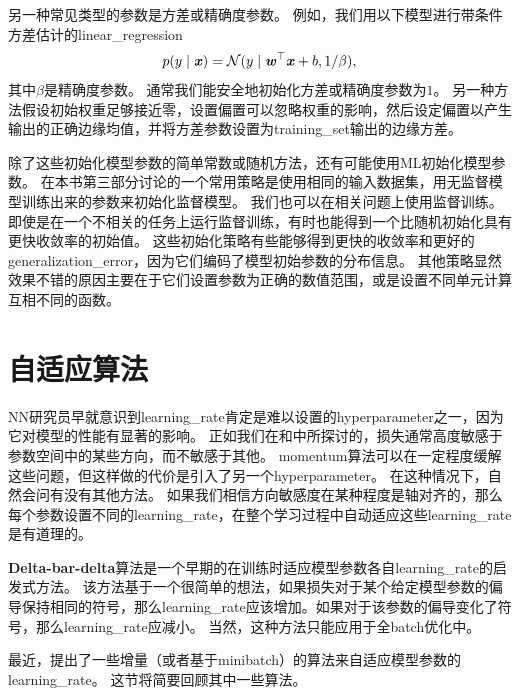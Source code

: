 另一种常见类型的参数是方差或精确度参数。
例如，我们用以下模型进行带条件方差估计的\gls{linear_regression}
\begin{equation}
    p(y\mid\boldsymbol{\mathit{x}}) = \mathcal{N} (y \mid \boldsymbol{\mathit{w}}^\top \boldsymbol{\mathit{x}} + b, 1/\beta) ,
\end{equation}
其中$\beta$是精确度参数。
通常我们能安全地初始化方差或精确度参数为$1$。
另一种方法假设初始权重足够接近零，设置偏置可以忽略权重的影响，然后设定偏置以产生输出的正确边缘均值，并将方差参数设置为\gls{training_set}输出的边缘方差。


除了这些初始化模型参数的简单常数或随机方法，还有可能使用\gls{ML}初始化模型参数。
在本书第三部分讨论的一个常用策略是使用相同的输入数据集，用无监督模型训练出来的参数来初始化监督模型。
我们也可以在相关问题上使用监督训练。
即使是在一个不相关的任务上运行监督训练，有时也能得到一个比随机初始化具有更快收敛率的初始值。
这些初始化策略有些能够得到更快的收敛率和更好的\gls{generalization_error}，因为它们编码了模型初始参数的分布信息。
其他策略显然效果不错的原因主要在于它们设置参数为正确的数值范围，或是设置不同单元计算互相不同的函数。


\section{自适应算法}
\label{sec:algorithms_with_adaptive_learning_rates}
\gls{NN}研究员早就意识到\gls{learning_rate}肯定是难以设置的\gls{hyperparameter}之一，因为它对模型的性能有显著的影响。
正如我们在和中所探讨的，损失通常高度敏感于参数空间中的某些方向，而不敏感于其他。
\gls{momentum}算法可以在一定程度缓解这些问题，但这样做的代价是引入了另一个\gls{hyperparameter}。
在这种情况下，自然会问有没有其他方法。
如果我们相信方向敏感度在某种程度是轴对齐的，那么每个参数设置不同的\gls{learning_rate}，在整个学习过程中自动适应这些\gls{learning_rate}是有道理的。



\textbf{Delta-bar-delta}算法\citep{jacobs1988}是一个早期的在训练时适应模型参数各自\gls{learning_rate}的启发式方法。
该方法基于一个很简单的想法，如果损失对于某个给定模型参数的偏导保持相同的符号，那么\gls{learning_rate}应该增加。如果对于该参数的偏导变化了符号，那么\gls{learning_rate}应减小。
当然，这种方法只能应用于全\gls{batch}优化中。


最近，提出了一些增量（或者基于\gls{minibatch}）的算法来自适应模型参数的\gls{learning_rate}。
这节将简要回顾其中一些算法。



